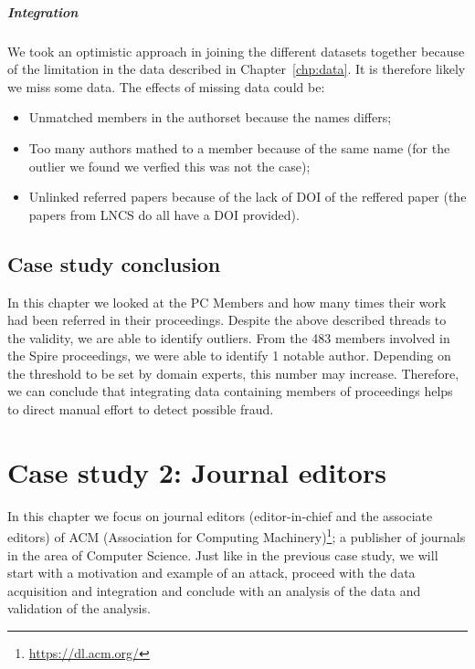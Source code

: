 \documentclass{ou-report}
\begin{document}
\paragraph{Integration}
We took an optimistic approach in joining the different datasets together 
because of the limitation in the data described in Chapter~\ref{chp:data}. It
is therefore likely we miss some data. The effects of missing data could be:
\begin{itemize}
    \item Unmatched members in the authorset because the names differs;
    \item Too many authors mathed to a member because of the same name (for
    the outlier we found we verfied this was not the case);
    \item Unlinked referred papers because of the lack of DOI of the reffered 
    paper (the papers from LNCS do all have a DOI provided).
\end{itemize}

\section{Case study conclusion}
In this chapter we looked at the PC Members and how many times their work had
been referred in their proceedings. 
Despite the above described threads to the validity, we are able to identify 
outliers. From the 483 members involved in the Spire proceedings, we were able 
to identify 1 notable author. Depending on the threshold to be set by domain 
experts, this number may increase. Therefore, we can conclude that integrating 
data containing members of proceedings helps to direct manual effort to detect 
possible fraud.

\chapter{Case study 2: Journal editors}
\label{chp:case2}
In this chapter we focus on journal editors (editor-in-chief and the associate
editors) of ACM (Association for Computing
Machinery)\footnote{\url{https://dl.acm.org/}}; a publisher of journals in the
area of Computer Science. Just like in the previous case study, we will start
with a motivation and example of an attack, proceed with the data acquisition
and integration and conclude with an analysis of the data and validation of the
analysis.
\end{document}
